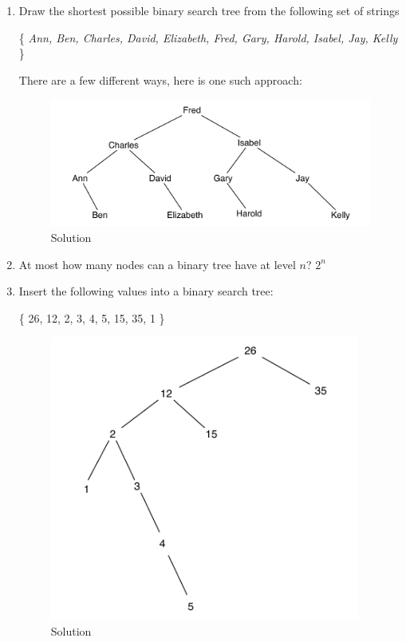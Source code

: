 \documentclass[11pt]{article}
\begin{document}
{\begin{enumerate}
\item Draw the shortest possible binary search tree from the following set of strings 
\begin{center}\{ {\it Ann, Ben, Charles, David, Elizabeth, Fred, Gary, Harold, Isabel, Jay, Kelly} \}\end{center}

\noindent
{\color{red} There are a few different ways, here is one such approach:}

\begin{figure}[h]
\centerline {
\includegraphics[width=5in]{shortest-bst.pdf}
}
{\color{red} \caption{Solution}}
\end{figure}

\newpage



\item At most how many nodes can a binary tree have at level $n$? {\color{red} $2^{n}$}


\item Insert the following values into a binary search tree:
\begin{center} \{ 26, 12, 2, 3, 4, 5, 15, 35, 1 \} \end{center}

\begin{figure}[h]
\centerline {
\includegraphics[width=4in]{insert-bst.pdf}
}
{\color{red} \caption{Solution}}
\end{figure}


\end{enumerate}}
\end{document}
